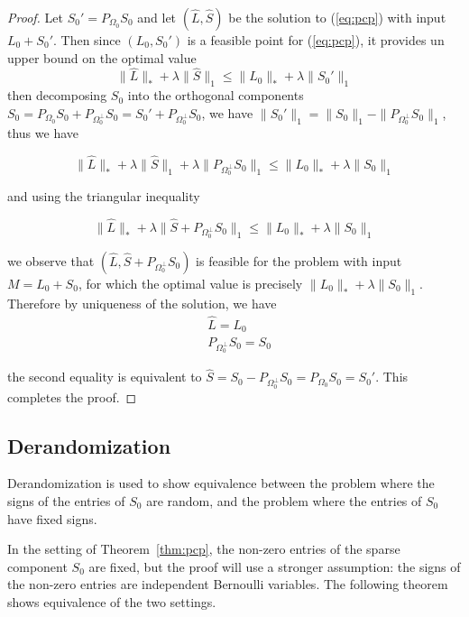 \begin{proof}
Let $S_0' = P_{\Omega_0} S_0$ and let $(\hat{L}, \hat{S})$ be the solution to (\ref{eq:pcp}) with input $L_0 + S_0'$. Then since $(L_0, S_0')$ is a feasible point for (\ref{eq:pcp}), it provides un upper bound on the optimal value
\[
\|\hat{L}\|_* + \lambda \|\hat{S}\|_1 \leq \|L_0\|_* + \lambda \|S_0'\|_1
\]
then decomposing $S_0$ into the orthogonal components $S_0 = P_{\Omega_0} S_0 + P_{\Omega_0^\perp} S_0 = S_0' + P_{\Omega_0^\perp} S_0$, we have $\|S_0'\|_1 = \|S_0\|_1 - \|P_{\Omega_0^\perp} S_0\|_1$, thus we have

\[
\|\hat{L}\|_* + \lambda \|\hat{S}\|_1 + \lambda \|P_{\Omega_0^\perp} S_0\|_1 \leq \|L_0\|_* + \lambda \|S_0\|_1
\]

and using the triangular inequality

\[
\|\hat{L}\|_* + \lambda \|\hat{S} + P_{\Omega_0^\perp} S_0\|_1 \leq \|L_0\|_* + \lambda \|S_0\|_1
\]

we observe that $(\hat{L}, \hat{S} + P_{\Omega_0^\perp} S_0)$ is feasible for the problem with input $M = L_0 + S_0$, for which the optimal value is precisely $\|L_0\|_* + \lambda \|S_0\|_1$. Therefore by uniqueness of the solution, we have
\[
\begin{aligned}
&\hat{L} = L_0 \\
&P_{\Omega_0^\perp} S_0 = S_0
\end{aligned}
\]

the second equality is equivalent to $\hat{S} = S_0 - P_{\Omega_0^\perp} S_0 = P_{\Omega_0} S_0 = S_0'$. This completes the proof.
\end{proof}


\subsection{Derandomization}
Derandomization is used to show equivalence between the problem where the signs of the entries of $S_0$ are random, and the problem where the entries of $S_0$ have fixed signs.

In the setting of Theorem~\ref{thm:pcp}, the non-zero entries of the sparse component $S_0$ are fixed, but the proof will use a stronger assumption: the signs of the non-zero entries are independent Bernoulli variables. The following theorem shows equivalence of the two settings.


